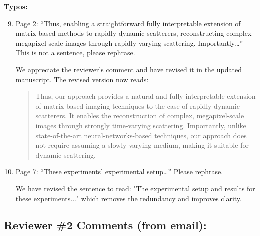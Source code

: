 \documentclass[12pt]{article}
\newenvironment{solved_reviewercomment}
    {\begin{tcolorbox}[width=\linewidth,colback=gray!5,colframe=solved_commentcolor!50,title=Reviewer Comment,left=5pt,right=5pt]}
    {\end{tcolorbox}}
\newenvironment{ourresponse}
    {\begin{tcolorbox}[width=\linewidth,breakable,enhanced,colback=gray!5,colframe=responsecolor!50,title=Response,left=5pt,right=5pt]}
    {\end{tcolorbox}}
\begin{document}
\textbf{Typos:}
\begin{enumerate}[label=\arabic*.]
    \setcounter{enumi}{8}
    \item  \leavevmode\vspace{-\baselineskip}
    \begin{solved_reviewercomment}
        Page 2: “Thus, enabling a straightforward fully interpretable extension of matrix-based methods to rapidly dynamic scatterers, reconstructing complex megapixel-scale images through rapidly varying scattering. Importantly…” This is not a sentence, please rephrase.
    \end{solved_reviewercomment}

    \begin{ourresponse}
        We appreciate the reviewer’s comment and have revised it in the updated manuscript. The revised version now reads:
        
        \begin{quote}
            Thus, our approach provides a natural and fully interpretable extension of matrix-based imaging techniques to the case of rapidly dynamic scatterers. It enables the reconstruction of complex, megapixel-scale images through strongly time-varying scattering. Importantly, unlike state-of-the-art neural-networks-based techniques, our approach does not require assuming a slowly varying medium, making it suitable for dynamic scattering.
        \end{quote}
        
    \end{ourresponse}



    \item  \leavevmode\vspace{-\baselineskip}
    \begin{solved_reviewercomment}
        Page 7: “These experiments’ experimental setup…” Please rephrase.
    \end{solved_reviewercomment}
    \begin{ourresponse}
        We have revised the sentence to read: "The experimental setup and results for these experiments..." which removes the redundancy and improves clarity.
    \end{ourresponse}
    
\end{enumerate}


\subsection*{Reviewer \#2 Comments (from email):}
\end{document}
